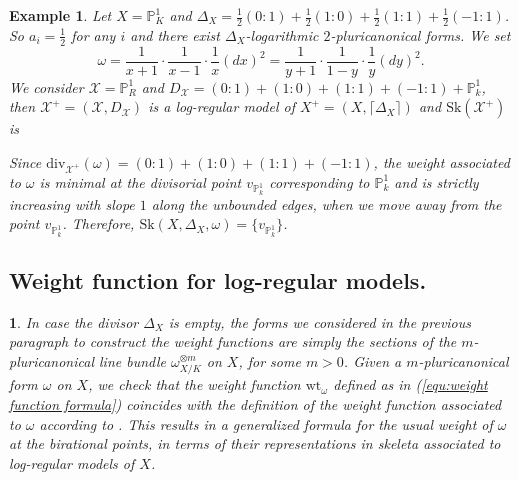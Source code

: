 \documentclass{amsart}%
\numberwithin{equation}{subsection}
\theoremstyle{plain2}
\theoremstyle{definition2}
\newtheorem{example}[equation]{Example}
\theoremstyle{stepstyle}
\theoremstyle{point}
\theoremstyle{subpoint}
\newtheorem{subpoint}[equation]{}%
\newcommand{\spa}[1]{\begin{subpoint}#1\end{subpoint}}           %
\newcommand{\cX}{\ensuremath{\mathscr{X}}}
\newcommand{\divisor}{\mathrm{div}}
\newcommand{\weight}{\mathrm{wt}}
\newcommand{\Sk}{\mathrm{Sk}}
\begin{document}
\begin{example}
Let $X=\mathbb{P}^1_K$ and $\Delta_X=\frac{1}{2}(0:1) + \frac{1}{2}(1:0)+\frac{1}{2}(1:1)+\frac{1}{2}(-1:1)$. So $a_i=\frac{1}{2}$ for any $i$ and there exist $\Delta_X$-logarithmic $2$-pluricanonical forms. We set $$\omega = \frac{1}{x+1} \cdot \frac{1}{x-1} \cdot \frac{1}{x} (dx)^2= \frac{1}{y+1} \cdot \frac{1}{1-y}\cdot \frac{1}{y} (dy)^2.$$ We consider $\cX= \mathbb{P}_R^1$ and $D_\cX= (0:1) + (1:0)+ (1:1)+(-1:1)+ \mathbb{P}^1_k$, then $\cX^+=(\cX,D_\cX)$ is a log-regular model of $X^+=(X,\lceil \Delta_X \rceil)$ and $\Sk(\cX^+)$ is \begin{center}
\end{center}
Since $\divisor_{\cX^+}(\omega)= (0:1) + (1:0)+ (1:1)+(-1:1)$, the weight associated to $\omega$ is minimal at the divisorial point $v_{\mathbb{P}_k^1}$ corresponding to $\mathbb{P}^1_k$ and is strictly increasing with slope $1$ along the unbounded edges, when we move away from the point $v_{\mathbb{P}^1_k}$. Therefore, $\Sk(X,\Delta_X,\omega)=\{v_{\mathbb{P}^1_k}\}$.
\end{example}

\subsection{Weight function for log-regular models.}
\spa{In case the divisor $\Delta_X$ is empty, the forms we considered in the previous paragraph to construct the weight functions are simply the sections of the $m$-pluricanonical line bundle $\omega_{X/K}^{\otimes m}$ on $X$, for some $m>0$. Given a $m$-pluricanonical form $\omega$ on $X$, we check that the weight function $\weight_{\omega}$ defined as in (\ref{equ:weight function formula}) coincides with the definition of the weight function associated to $\omega$ according to \cite{MustataNicaise}. This results in a generalized formula for the usual weight of $\omega$ at the birational points, in terms of their representations in skeleta associated to log-regular models of $X$.}
\end{document}

